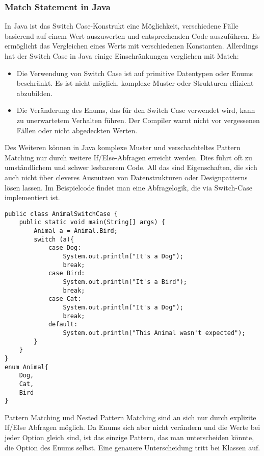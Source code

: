 \documentclass[a4paper, 1ppt]{article}
\begin{document}
\subsubsection{Match Statement in Java}
In Java ist das Switch Case-Konstrukt eine Möglichkeit, verschiedene Fälle basierend auf einem Wert auszuwerten und entsprechenden Code auszuführen. Es ermöglicht das Vergleichen eines Werts mit verschiedenen Konstanten. Allerdings hat der Switch Case in Java einige Einschränkungen verglichen mit Match:
\begin{itemize}
	\item Die Verwendung von Switch Case ist auf primitive Datentypen oder Enums beschränkt. Es ist nicht möglich, komplexe Muster oder Strukturen effizient abzubilden.
	\item Die Veränderung des Enums, das für den Switch Case verwendet wird, kann zu unerwartetem Verhalten führen. Der Compiler warnt nicht vor vergessenen Fällen oder nicht abgedeckten Werten. 
\end{itemize}
Des Weiteren können in Java komplexe Muster und verschachteltes Pattern Matching nur durch weitere If/Else-Abfragen erreicht werden. Dies führt oft zu umständlichem und schwer lesbarerem Code.
All das sind Eigenschaften, die sich auch nicht über cleveres Ausnutzen von Datenstrukturen oder Designpatterns lösen lassen.
Im Beispielcode findet man eine Abfragelogik, die via Switch-Case implementiert ist.
\begin{verbatim}
public class AnimalSwitchCase {
    public static void main(String[] args) {
        Animal a = Animal.Bird;
        switch (a){
            case Dog:
                System.out.println("It's a Dog");
                break;
            case Bird:
                System.out.println("It's a Bird");
                break;
            case Cat:
                System.out.println("It's a Dog");
                break;
            default:
                System.out.println("This Animal wasn't expected");
        }
    }
}
enum Animal{
    Dog,
    Cat,
    Bird
}
\end{verbatim}
Pattern Matching und Nested Pattern Matching sind an sich nur durch explizite If/Else Abfragen möglich. Da Enums sich aber nicht verändern und die Werte bei jeder Option gleich sind, ist das einzige Pattern, das man unterscheiden könnte, die Option des Enums selbst. Eine genauere Unterscheidung tritt bei Klassen auf.
\newpage
\end{document}
